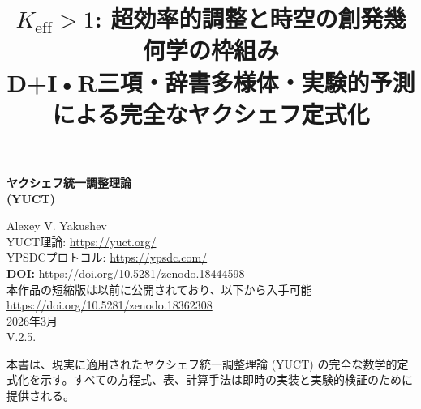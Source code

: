 \documentclass[11pt,a4paper]{article}
\title{$K_{\mathrm{eff}} > 1$: 超効率的調整と時空の創発幾何学の枠組み \\ 
	\large D+I•R三項・辞書多様体・実験的予測による完全なヤクシェフ定式化}
\begin{document}
	
	\begin{titlepage}
		\begin{center}
			\vspace*{3cm}
			\Huge\textbf{ヤクシェフ統一調整理論\\ (YUCT)}
			\vspace{2cm}
			
			\Large
			Alexey V. Yakushev\\
			\vspace{2cm}
			YUCT理論: \url{https://yuct.org/}\\
			YPSDCプロトコル: \url{https://ypsdc.com/}\\
			
			\vspace{2cm}
			\textbf{DOI:} \url{https://doi.org/10.5281/zenodo.18444598}\\
			
			\vspace{1cm}
			\large 
			本作品の短縮版は以前に公開されており、以下から入手可能\\
			\url{https://doi.org/10.5281/zenodo.18362308}\\
			\vspace{1cm}
			2026年3月 \\ \large V.2.5.
			
			\vfill
			\normalsize
			本書は、現実に適用されたヤクシェフ統一調整理論 (YUCT) の完全な数学的定式化を示す。すべての方程式、表、計算手法は即時の実装と実験的検証のために提供される。
		\end{center}
	\end{titlepage}
	
	\tableofcontents
	\newpage
	
\end{document}
